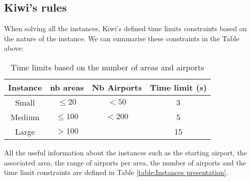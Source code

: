 \subsection{Kiwi's rules}
When solving all the instances, Kiwi's defined time limits constraints based on the nature of the instance. We can summarise these constraints in the Table above:
\begin{table}[!ht]
    \centering
    \caption{Time limits based on the number of areas and airports}
    \begin{tabular}{||cccc||}
        \toprule
        Instance & nb areas   & Nb Airports & Time limit (s) \\ [1ex]
        \midrule
        Small    & $\leq 20$  & $<50$       & 3              \\
        Medium   & $\leq 100$ & $<200$      & 5              \\
        Large    & $>100$     &             & 15             \\ [1ex]
        \bottomrule
    \end{tabular}
    \label{table:Time limit constraints}
\end{table}

All the useful information about the instances such as the starting airport, the associated area, the range of airports per area, the number of airports and the time limit constraints are defined in Table \ref{table:Instances presentation}.

